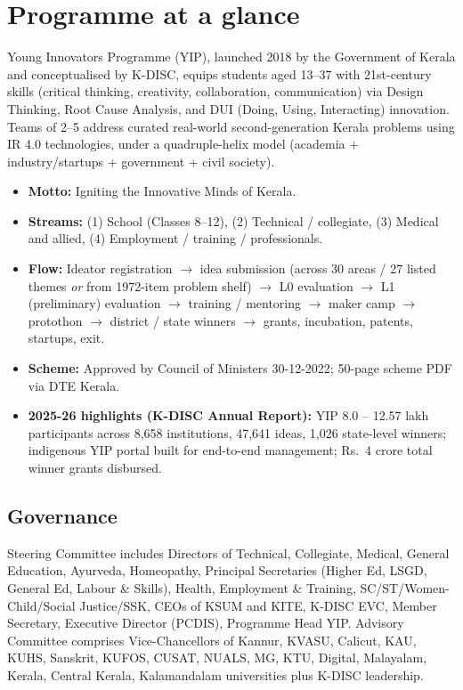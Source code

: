 \documentclass[11pt,a4paper]{article}
\begin{document}
\tableofcontents
\newpage

\section{Programme at a glance}

Young Innovators Programme (YIP), launched 2018 by the Government of Kerala and conceptualised by K-DISC, equips students aged 13--37 with 21st-century skills (critical thinking, creativity, collaboration, communication) via Design Thinking, Root Cause Analysis, and DUI (Doing, Using, Interacting) innovation. Teams of 2--5 address curated real-world second-generation Kerala problems using IR 4.0 technologies, under a quadruple-helix model (academia + industry/startups + government + civil society).

\begin{itemize}[leftmargin=1.2em]
\item \textbf{Motto:} Igniting the Innovative Minds of Kerala.
\item \textbf{Streams:} (1) School (Classes 8--12), (2) Technical / collegiate, (3) Medical and allied, (4) Employment / training / professionals.
\item \textbf{Flow:} Ideator registration $\rightarrow$ idea submission (across 30 areas / 27 listed themes \textit{or} from 1972-item problem shelf) $\rightarrow$ L0 evaluation $\rightarrow$ L1 (preliminary) evaluation $\rightarrow$ training / mentoring $\rightarrow$ maker camp $\rightarrow$ protothon $\rightarrow$ district / state winners $\rightarrow$ grants, incubation, patents, startups, exit.
\item \textbf{Scheme:} Approved by Council of Ministers 30-12-2022; 50-page scheme PDF via DTE Kerala.
\item \textbf{2025-26 highlights (K-DISC Annual Report):} YIP 8.0 -- 12.57 lakh participants across 8,658 institutions, 47,641 ideas, 1,026 state-level winners; indigenous YIP portal built for end-to-end management; Rs.\ 4 crore total winner grants disbursed.
\end{itemize}

\subsection{Governance}
Steering Committee includes Directors of Technical, Collegiate, Medical, General Education, Ayurveda, Homeopathy, Principal Secretaries (Higher Ed, LSGD, General Ed, Labour \& Skills), Health, Employment \& Training, SC/ST/Women-Child/Social Justice/SSK, CEOs of KSUM and KITE, K-DISC EVC, Member Secretary, Executive Director (PCDIS), Programme Head YIP. Advisory Committee comprises Vice-Chancellors of Kannur, KVASU, Calicut, KAU, KUHS, Sanskrit, KUFOS, CUSAT, NUALS, MG, KTU, Digital, Malayalam, Kerala, Central Kerala, Kalamandalam universities plus K-DISC leadership.
\end{document}
